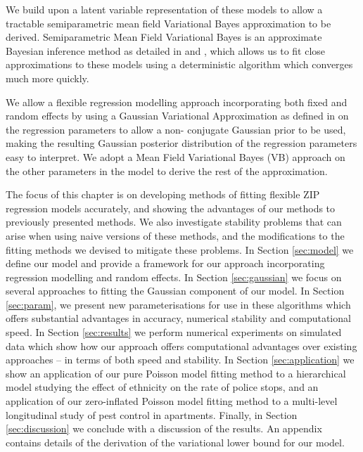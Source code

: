 We build upon a latent variable representation of these models to allow a tractable semiparametric mean field
Variational Bayes approximation to be derived. Semiparametric Mean Field Variational Bayes is an approximate
Bayesian inference method as detailed in \cite{Ormerod2010} and \cite{Rohde2015}, which allows us to fit
close approximations to these models using a deterministic  algorithm which converges much more quickly.

We allow a flexible regression modelling approach incorporating both fixed and random effects by using a
Gaussian Variational Approximation as defined in \cite{Ormerod2012} on the regression parameters to allow a
non- conjugate Gaussian prior to be used, making the resulting Gaussian posterior distribution of the
regression parameters easy to interpret. We adopt a Mean Field  Variational Bayes (VB) approach on the other
parameters in the model to derive the rest of the approximation.

The focus of this chapter is on developing methods of fitting flexible ZIP regression models accurately, and
showing the advantages of our methods to previously presented methods. We also investigate stability problems
that can arise when using naive versions of these methods, and the modifications to the fitting methods we
devised to mitigate these problems. In Section \ref{sec:model} we define our model and provide a framework for
our approach incorporating regression modelling and random effects. In Section \ref{sec:gaussian} we focus on
several approaches to fitting the Gaussian component of our model. In Section \ref{sec:param}, we present new
parameterisations for use in these algorithms which offers substantial advantages in accuracy, numerical
stability and computational speed. In Section \ref{sec:results} we perform numerical experiments on simulated
data which show how our approach offers computational advantages over existing approaches -- in terms of both
speed and stability. In Section \ref{sec:application} we show an application of our pure Poisson model fitting
method to a hierarchical model studying the effect of ethnicity on the rate of police stops, and an
application of our zero-inflated Poisson model fitting method to a multi-level longitudinal study of pest
control in apartments. Finally, in Section \ref{sec:discussion} we conclude with a discussion of the results.
An appendix contains details of the derivation of the variational lower bound for our model.

